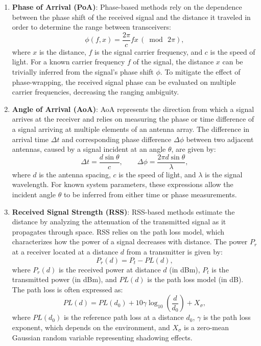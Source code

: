 \begin{enumerate}
    \item \textbf{Phase of Arrival (PoA)}: Phase-based methods rely on the dependence between the phase shift of the received signal and the distance it traveled in order to determine the range between transceivers:
    \begin{equation}
        \phi(f, x) = \frac{2\pi}{c}fx\,(\bmod\,2\pi),
    \end{equation}
    where $x$ is the distance, $f$ is the signal carrier frequency, and $c$ is the speed of light. For a known carrier frequency $f$ of the signal, the distance $x$ can be trivially inferred from the signal's phase shift $\phi$. To mitigate the effect of phase-wrapping, the received signal phase can be evaluated on multiple carrier frequencies, decreasing the ranging ambiguity. 
    
    \item \textbf{Angle of Arrival (AoA)}: AoA represents the direction from which a signal arrives at the receiver and relies on measuring the phase or time difference of a signal arriving at multiple elements of an antenna array. The difference in arrival time $\Delta t$ and corresponding phase difference $\Delta \phi$ between two adjacent antennas, caused by a signal incident at an angle $\theta$, are given by:
    \begin{equation} 
    \Delta t = \frac{d \sin \theta}{c}, \qquad \Delta \phi = \frac{2\pi d \sin \theta}{\lambda}, 
    \end{equation}
    where $d$ is the antenna spacing, $c$ is the speed of light, and $\lambda$ is the signal wavelength. For known system parameters, these expressions allow the incident angle $\theta$ to be inferred from either time or phase measurements.
    
    \item \textbf{Received Signal Strength (RSS)}: RSS-based methods estimate the distance by analyzing the attenuation of the transmitted signal as it propagates through space. RSS relies on the path loss model, which characterizes how the power of a signal decreases with distance. The power $P_r$ at a receiver located at a distance $d$ from a transmitter is given by:
    \begin{equation}
    P_r(d) = P_t - PL(d),
    \end{equation}
    where $P_r(d)$ is the received power at distance $d$ (in dBm), $P_t$ is the transmitted power (in dBm), and $PL(d)$ is the path loss model (in dB). The path loss is often expressed as:
    \begin{equation}
    PL(d) = PL(d_0) + 10\gamma \log_{10} \left( \frac{d}{d_0} \right) + X_{\sigma},
    \end{equation}
    where $PL(d_0)$ is the reference path loss at a distance $d_0$, $\gamma$ is the path loss exponent, which depends on the environment, and $X_{\sigma}$ is a zero-mean Gaussian random variable representing shadowing effects.
    

\end{enumerate}
